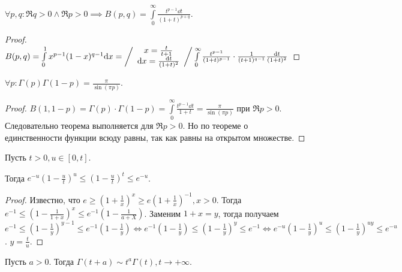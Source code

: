 \begin{lemma}
    $\forall p, q\!: \Re q > 0 \land \Re p > 0 \implies B(p, q) = \int\limits_{0}^{\infty} \frac{t^{p - 1}\dd{t}}{(1+t)^{p+q}}$.
\end{lemma}
\begin{proof}
    $B(p, q) = \int\limits_{0}^{1} x^{p-1}(1-x)^{q - 1}\mathrm{d}x =  \left / \begin{array}{c} x = \frac{t}{t+1} \\ \mathrm{d}x = \frac{\mathrm{d}t}{(1+t)^2} \end{array}\right / \int\limits_{0}^{\infty} \frac{t^{p - 1}}{(1+t)^{p-1}} \cdot \frac{1}{(t+1)^{q - 1}} \frac{\mathrm{d}t}{(1+t)^{2}}$
\end{proof}
\begin{theorem}
    $\forall p\!: \Gamma(p)\Gamma(1-p) = \frac{\pi}{\sin \left( \pi p \right)}$.
\end{theorem}
\begin{proof}
    $B(1, 1-p) = \Gamma(p) \cdot \Gamma(1-p) = \int\limits_{0}^{\infty} \frac{t^{p - 1}\dd{t}}{1+t} = \frac{\pi}{\sin \left( \pi p \right)}$ при $\Re p > 0$. Следовательно теорема выполняется для  $\Re p > 0$. Но по теореме о единственности функции всюду равны, так как равны на открытом множестве.
\end{proof}
\begin{lemma}
    Пусть  $t >0, u \in \left[ 0, t \right]$.

    Тогда $e^{-u}\left( 1 - \frac{u}{t} \right) ^{u} \le \left( 1 - \frac{u}{t} \right) ^t \le  e^{-u}$.
\end{lemma}
\begin{proof}
    Известно, что $e \ge \left( 1+\frac{1}{x} \right)^x \ge e \left( 1+\frac{1}{x} \right)^{-1}, x > 0$. Тогда $e^{-1} \le \left( 1 - \frac{1}{1+x} \right) ^{x} \le e^{-1}\left( 1-\frac{1}{a+X} \right)$. Заменим $1+x=y$, тогда получаем  $e^{-1} \le \left( 1 - \frac{1}{y} \right)^{y - 1} \le e^{-1} (1-\frac{1}{y}) \iff e^{-1}(1 - \frac{1}{y}) \le \left( 1-\frac{1}{y} \right)^y \le  e^{-1} \iff e^{-u}\left( 1-\frac{1}{y} \right)^u \le  \left( 1-\frac{1}{y} \right)^{uy} \le  e^{-u}$. $y = \frac{t}{u}$.
\end{proof}
\begin{theorem}
    Пусть $a > 0$. Тогда  $\Gamma(t+a) \sim t^a \Gamma(t), t \to +\infty$.
\end{theorem}
